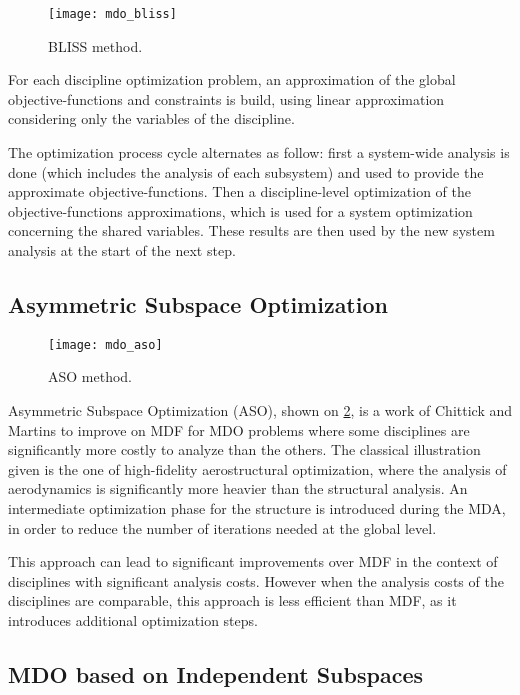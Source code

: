 \begin{figure}
\centering
\texttt{[image: mdo\_bliss]}
\caption{BLISS method.}\label{bliss_graph}
\end{figure}

For each discipline optimization problem, an approximation of the global objective-functions and constraints is build, using linear approximation considering only the variables of the discipline.

The optimization process cycle alternates as follow: first a system-wide analysis is done (which includes the analysis of each subsystem) and used to provide the approximate objective-functions. Then a discipline-level optimization of the objective-functions approximations, which is used for a system optimization concerning the shared variables. These results are then used by the new system analysis at the start of the next step.

\subsection{Asymmetric Subspace Optimization}

\begin{figure}
\centering
\texttt{[image: mdo\_aso]}
\caption{ASO method.}\label{aso_graph}
\end{figure}

Asymmetric Subspace Optimization (ASO), shown on \figurename{} \ref{aso_graph}, is a work of Chittick and Martins \cite{Chittick:2007:B} to improve on MDF for MDO problems where some disciplines are significantly more costly to analyze than the others. The classical illustration given is the one of high-fidelity aerostructural optimization, where the analysis of aerodynamics is significantly more heavier than the structural analysis. An intermediate optimization phase for the structure is introduced during the MDA, in order to reduce the number of iterations needed at the global level.

This approach can lead to significant improvements over MDF in the context of disciplines with significant analysis costs. However when the analysis costs of the disciplines are comparable, this approach is less efficient than MDF, as it introduces additional optimization steps.

\subsection{MDO based on Independent Subspaces}\label{MDOIS_desc}

